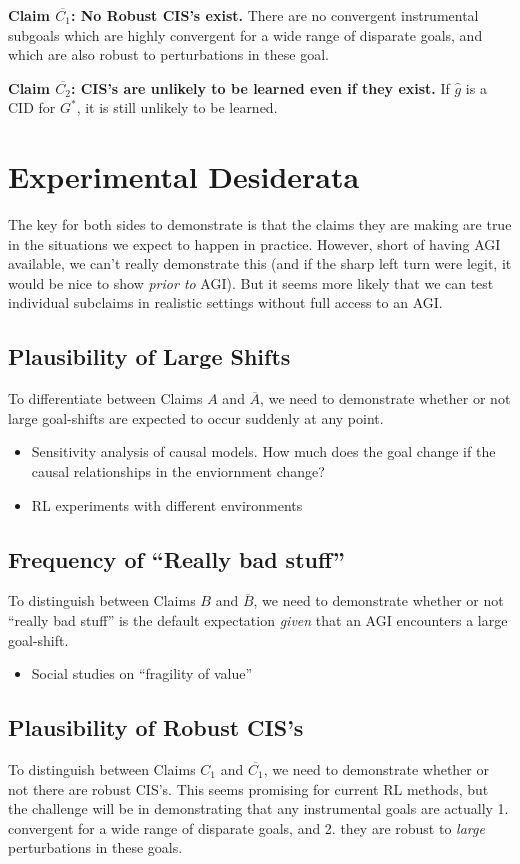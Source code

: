 \documentclass{article}
\begin{document}
\textbf{Claim $\overline{C_1}$: No Robust CIS's exist.} There are no convergent instrumental subgoals which are highly convergent for a wide range of disparate goals, and which are also robust to perturbations in these goal.

\textbf{Claim $\overline{C_2}$: CIS's are unlikely to be learned even if they exist.} If $\hat{g}$ is a CID for $G^*$, it is still unlikely to be learned.

\section{Experimental Desiderata}
The key for both sides to demonstrate is that the claims they are making are true in the situations we expect to happen in practice. However, short of having AGI available, we can’t really demonstrate this (and if the sharp left turn were legit, it would be nice to show \emph{prior to} AGI). But it seems more likely that we can test individual subclaims in realistic settings without full access to an AGI. 

\subsection{Plausibility of Large Shifts}
To differentiate between Claims $A$ and $\overline{A}$, we need to demonstrate whether or not large goal-shifts are expected to occur suddenly at any point. 
\begin{itemize}
    \item Sensitivity analysis of causal models. How much does the goal change if the causal relationships in the enviornment change?
    \item RL experiments with different environments
\end{itemize}

\subsection{Frequency of ``Really bad stuff”}
To distinguish between Claims $B$ and $\overline{B}$, we need to demonstrate whether or not “really bad stuff” is the default expectation \emph{given} that an AGI encounters a large goal-shift.
\begin{itemize}
    \item Social studies on “fragility of value”
\end{itemize}
\subsection{Plausibility of Robust CIS's}
To distinguish between Claims $C_1$ and $\overline{C_1}$, we need to demonstrate whether or not there are robust CIS's. This seems promising for current RL methods, but the challenge will be in demonstrating that any instrumental goals are actually 1. convergent for a wide range of disparate goals, and 2. they are robust to \emph{large} perturbations in these goals.
\end{document}

